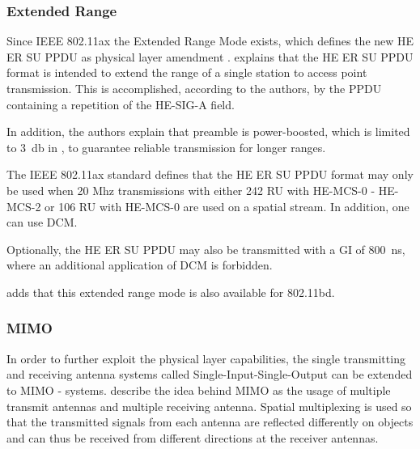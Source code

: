 \subsubsection*{Extended Range}
Since IEEE 802.11ax the Extended Range Mode exists, which defines the new HE ER SU \ac{PPDU} as physical layer amendment \cite{standard_ieee_2021} \cite{afaqui_ieee_2017}. 
\textcite{deng_ieee_2017} explains that the HE ER SU \ac{PPDU} format is intended to extend the range of a single station to access point transmission. This is accomplished, according to the authors, by the PPDU containing a repetition of the HE-SIG-A field.

In addition, the authors explain that preamble is power-boosted, which is limited to \SI{3}{\decibel} in \cite{standard_ieee_2021} \cite{jacob_system-level_2020}, to guarantee reliable transmission for longer ranges. 

The IEEE 802.11ax \cite{standard_ieee_2021} standard defines that the HE ER SU \ac{PPDU} format may only be used when 20 Mhz transmissions with either 242 RU with HE-MCS-0 - HE-MCS-2 or 106 RU with HE-MCS-0 are used on a spatial stream. In addition, one can use \ac{DCM}.

Optionally, the HE ER SU \ac{PPDU} may also be transmitted with a \ac{GI} of \SI{800}{\nano\second}, where an additional application of \ac{DCM} is forbidden. 
	
\textcite{jacob_system-level_2020} adds that this extended range mode is also available for 802.11bd.






\subsubsection*{\acf{MIMO}}
In order to further exploit the physical layer capabilities, the single transmitting and receiving antenna systems called Single-Input-Single-Output can be extended to \ac{MIMO} - systems.
\textcite{sauter_wireless_2022} describe the idea behind \ac{MIMO} as the usage of multiple transmit antennas and multiple receiving antenna. Spatial multiplexing is used so that the transmitted signals from each antenna are reflected differently on objects and can thus be received from different directions at the receiver antennas. 

